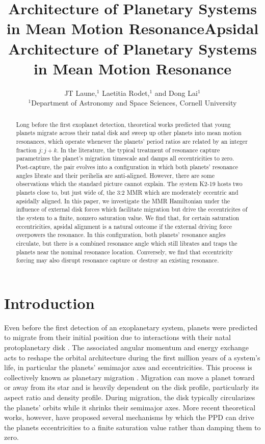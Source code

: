 \documentclass[usenatbib,twocolumn]{mnras}
\title[MMR Architecture]{Architecture of Planetary Systems in Mean Motion Resonance}
\author[Laune et al.]{
JT Laune,$^{1}$
Laetitia Rodet,$^{1}$
and Dong Lai$^{1}$
\\
$^{1}$Department of Astronomy and Space Sciences, Cornell University\\}
\date{}
\title{Apsidal Architecture of Planetary Systems in Mean Motion Resonance}
\begin{document}
\maketitle
\begin{abstract} Long before the first exoplanet detection,
theoretical works predicted that young planets migrate across their
natal disk and sweep up other planets into mean motion resonances,
which operate whenever the planets' period ratios are related by an
integer fraction $j:j+k$.  In the literature, the typical treatment of
resonance capture parametrizes the planet's migration timescale and
damps all eccentricities to zero.  Post-capture, the pair evolves into
a configuration in which both planets' resonance angles librate and
their perihelia are anti-aligned.  However, there are some
observations which the standard picture cannot explain. The system
K2-19 hosts two planets close to, but just wide of, the 3:2 MMR which
are moderately eccentric and apsidally aligned.  In this paper, we
investigate the MMR Hamiltonian under the influence of external disk
forces which facilitate migration but drive the eccentricites of the
system to a finite, nonzero saturation value.  We find that, for
certain saturation eccentricities, apsidal alignment is a natural
outcome if the external driving force overpowers the resonance.  In
this configuration, both planets' resonance angles circulate, but
there is a combined resonance angle which still librates and traps the
planets near the nominal resonance location.  Conversely, we find that
eccentricity forcing may also disrupt resonance capture or destroy an
existing resonance.
\end{abstract}

\section{Introduction}
\label{sec:orgff1f9d7}
Even before the first detection of an exoplanetary system, planets
were predicted to migrate from their initial position due to
interactions with their natal protoplanetary disk
\citep[PPD, ][]{lin79_tidal_torques_accret_discs_binar,goldreich_excitation_1979,goldreich_disk-satellite_1980-1,moutamid14_coupl_between_corot_lindb_reson}.
The associated angular momentum and energy exchange acts to reshape
the orbital architecture during the first million years of a system's
life, in particular the planets' semimajor axes and eccentricities.
This process is collectively known as planetary migration
\citep{nelson_planetary_2018}.  Migration can move a planet toward or
away from its star and is heavily dependent on the disk profile,
particularly its aspect ratio and density profile.  During migration,
the disk typically circularizes the planets' orbits while it shrinks
their semimajor axes.  More recent theoretical works, however, have
proposed several mechanisms by which the PPD can drive the planets
eccentricities to a finite saturation value rather than damping them
to zero.
\end{document}
